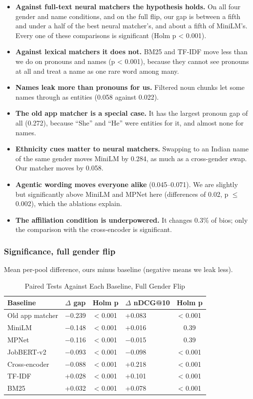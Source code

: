 \documentclass[conference,a4paper]{IEEEtran}
\begin{document}
\begin{itemize}
\item \textbf{Against full-text neural matchers the hypothesis holds.} On all four gender and name conditions, and on the full flip, our gap is between a fifth and under a half of the best neural matcher's, and about a fifth of MiniLM's. Every one of these comparisons is significant (Holm p < 0.001).
\item \textbf{Against lexical matchers it does not.} BM25 and TF-IDF move less than we do on pronouns and names (p < 0.001), because they cannot see pronouns at all and treat a name as one rare word among many.
\item \textbf{Names leak more than pronouns for us.} Filtered noun chunks let some names through as entities (0.058 against 0.022).
\item \textbf{The old app matcher is a special case.} It has the largest pronoun gap of all (0.272), because ``She'' and ``He'' were entities for it, and almost none for names.
\item \textbf{Ethnicity cues matter to neural matchers.} Swapping to an Indian name of the same gender moves MiniLM by 0.284, as much as a cross-gender swap. Our matcher moves by 0.058.
\item \textbf{Agentic wording moves everyone alike} (0.045–0.071). We are slightly but significantly above MiniLM and MPNet here (differences of 0.02, p $\le$ 0.002), which the ablations explain.
\item \textbf{The affiliation condition is underpowered.} It changes 0.3\% of bios; only the comparison with the cross-encoder is significant.
\end{itemize}
\subsubsection{Significance, full gender flip} Mean per-pool difference, ours minus baseline (negative means we leak less).

\begin{table}[!t]
\caption{Paired Tests Against Each Baseline, Full Gender Flip}
\label{tab:15}
\centering
\footnotesize
\begin{tabularx}{\columnwidth}{lcc>{\centering\arraybackslash}Xc}
\hline
\textbf{Baseline} & \textbf{$\Delta$ gap} & \textbf{Holm p} & \textbf{$\Delta$ nDCG@10} & \textbf{Holm p} \\
\hline
Old app matcher & $-$0.239 & < 0.001 & +0.083 & < 0.001 \\
MiniLM & $-$0.148 & < 0.001 & +0.016 & 0.39 \\
MPNet & $-$0.116 & < 0.001 & $-$0.015 & 0.39 \\
JobBERT-v2 & $-$0.093 & < 0.001 & $-$0.098 & < 0.001 \\
Cross-encoder & $-$0.088 & < 0.001 & +0.218 & < 0.001 \\
TF-IDF & +0.028 & < 0.001 & +0.101 & < 0.001 \\
BM25 & +0.032 & < 0.001 & +0.078 & < 0.001 \\
\hline
\end{tabularx}
\end{table}
\end{document}
